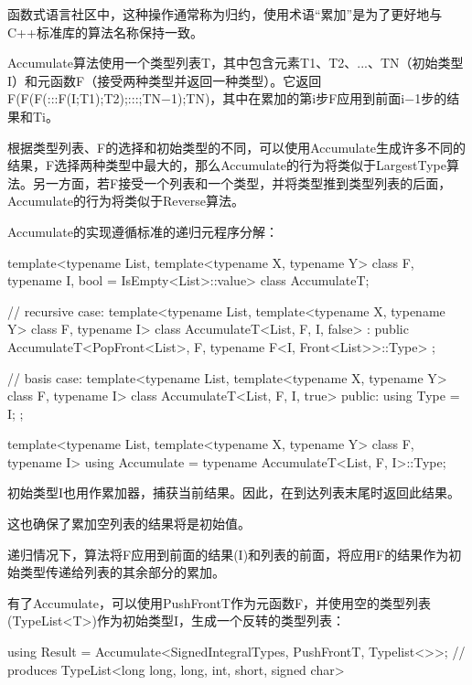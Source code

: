 \begin{notice}
函数式语言社区中，这种操作通常称为归约，使用术语“累加”是为了更好地与C++标准库的算法名称保持一致。
\end{notice}

Accumulate算法使用一个类型列表T，其中包含元素T1、T2、...、TN（初始类型I）和元函数F（接受两种类型并返回一种类型）。它返回F(F(F(:::F(I;T1);T2);:::;TN−1);TN)，其中在累加的第i步F应用到前面i−1步的结果和Ti。

根据类型列表、F的选择和初始类型的不同，可以使用Accumulate生成许多不同的结果，F选择两种类型中最大的，那么Accumulate的行为将类似于LargestType算法。另一方面，若F接受一个列表和一个类型，并将类型推到类型列表的后面，Accumulate的行为将类似于Reverse算法。

Accumulate的实现遵循标准的递归元程序分解：

\begin{cpp}
template<typename List,
		template<typename X, typename Y> class F,
		typename I,
		bool = IsEmpty<List>::value>
class AccumulateT;

// recursive case:
template<typename List,
		template<typename X, typename Y> class F,
		typename I>
class AccumulateT<List, F, I, false>
: public AccumulateT<PopFront<List>, F,
					typename F<I, Front<List>>::Type> {};

// basis case:
template<typename List,
		template<typename X, typename Y> class F,
		typename I>
class AccumulateT<List, F, I, true> {
	public:
	using Type = I;
};

template<typename List,
		template<typename X, typename Y> class F,
		typename I>
using Accumulate = typename AccumulateT<List, F, I>::Type;
\end{cpp}

初始类型I也用作累加器，捕获当前结果。因此，在到达列表末尾时返回此结果。

\begin{notice}
这也确保了累加空列表的结果将是初始值。
\end{notice}

递归情况下，算法将F应用到前面的结果(I)和列表的前面，将应用F的结果作为初始类型传递给列表的其余部分的累加。

有了Accumulate，可以使用PushFrontT作为元函数F，并使用空的类型列表(TypeList<T>)作为初始类型I，生成一个反转的类型列表：

\begin{cpp}
using Result = Accumulate<SignedIntegralTypes, PushFrontT, Typelist<>>;
				// produces TypeList<long long, long, int, short, signed char>
\end{cpp}


